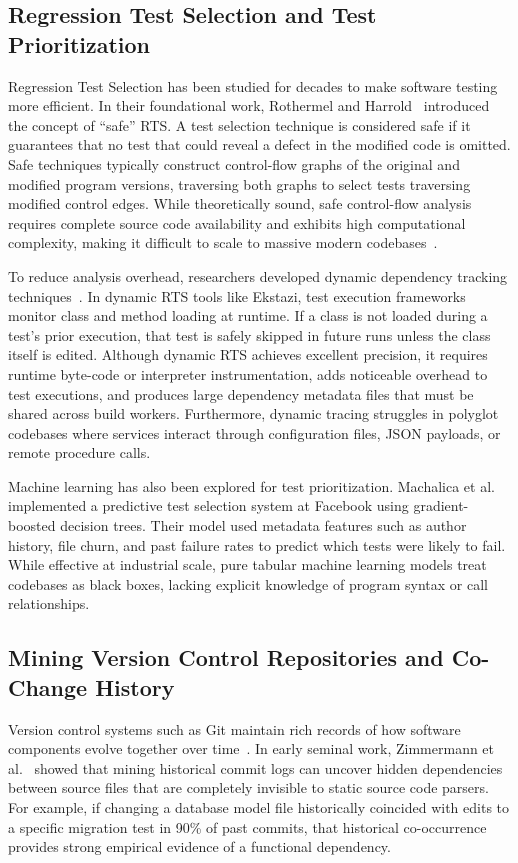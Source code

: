 \documentclass[12pt,onecolumn,draftclsnofoot]{IEEEtran}
\begin{document}
\subsection{Regression Test Selection and Test Prioritization}
Regression Test Selection has been studied for decades to make software testing more efficient. In their foundational work, Rothermel and Harrold~\cite{rothermel1997safe} introduced the concept of ``safe'' RTS. A test selection technique is considered safe if it guarantees that no test that could reveal a defect in the modified code is omitted. Safe techniques typically construct control-flow graphs of the original and modified program versions, traversing both graphs to select tests traversing modified control edges. While theoretically sound, safe control-flow analysis requires complete source code availability and exhibits high computational complexity, making it difficult to scale to massive modern codebases~\cite{engstrom2010systematic}.

To reduce analysis overhead, researchers developed dynamic dependency tracking techniques~\cite{chen2019test}. In dynamic RTS tools like Ekstazi, test execution frameworks monitor class and method loading at runtime. If a class is not loaded during a test's prior execution, that test is safely skipped in future runs unless the class itself is edited. Although dynamic RTS achieves excellent precision, it requires runtime byte-code or interpreter instrumentation, adds noticeable overhead to test executions, and produces large dependency metadata files that must be shared across build workers. Furthermore, dynamic tracing struggles in polyglot codebases where services interact through configuration files, JSON payloads, or remote procedure calls.

Machine learning has also been explored for test prioritization. Machalica et al.~\cite{machalica2019predictive} implemented a predictive test selection system at Facebook using gradient-boosted decision trees. Their model used metadata features such as author history, file churn, and past failure rates to predict which tests were likely to fail. While effective at industrial scale, pure tabular machine learning models treat codebases as black boxes, lacking explicit knowledge of program syntax or call relationships.

\subsection{Mining Version Control Repositories and Co-Change History}
Version control systems such as Git maintain rich records of how software components evolve together over time~\cite{zimmermann2005mining}. In early seminal work, Zimmermann et al.~\cite{zimmermann2005mining} showed that mining historical commit logs can uncover hidden dependencies between source files that are completely invisible to static source code parsers. For example, if changing a database model file historically coincided with edits to a specific migration test in 90\% of past commits, that historical co-occurrence provides strong empirical evidence of a functional dependency.
\end{document}
